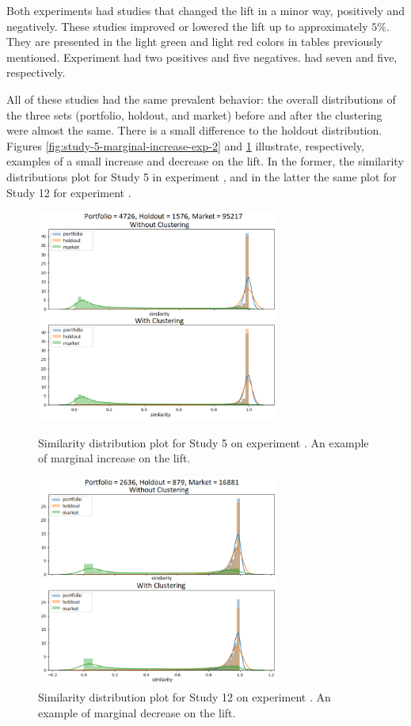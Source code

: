 Both experiments had studies that changed the lift in a minor way, positively and negatively. These studies improved or lowered the lift up to approximately $5\%$. They are presented in the light green and light red colors in tables previously mentioned. Experiment \nameExperimentI{} had two positives and five negatives. \nameExperimentII{} had seven and five, respectively.

All of these studies had the same prevalent behavior: the overall distributions of the three sets (portfolio, holdout, and market) before and after the clustering were almost the same. There is a small difference to the holdout distribution. Figures \ref{fig:study-5-marginal-increase-exp-2} and \ref{fig:study-12-marginal-decrease-exp-1} illustrate, respectively, examples of a small increase and decrease on the lift. In the former, the similarity distributions plot for Study 5 in experiment \nameExperimentII{}, and in the latter the same plot for Study 12 for experiment \nameExperimentI{}.

\begin{figure}[!ht]
   \centering
   \includegraphics[width=8cm]{fig/ch4-study-5-marginal-increase-exp-2.png}
   \caption{Similarity distribution plot for Study 5 on experiment \nameExperimentII{}. An example of marginal increase on the lift.}
   \label{fig:study-5-marginal-increase-exp-2}

   \includegraphics[width=8cm]{fig/ch4-study-12-marginal-decrease-exp-1.png}
   \caption{Similarity distribution plot for Study 12 on experiment \nameExperimentI{}. An example of marginal decrease on the lift.}
   \label{fig:study-12-marginal-decrease-exp-1}
\end{figure}

